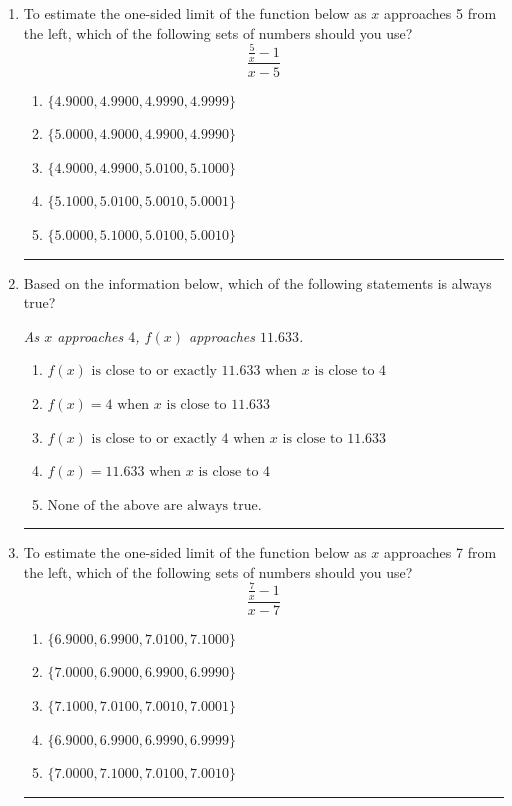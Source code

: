 \documentclass[14pt]{extbook}
\newcommand{\litem}[1]{\item#1\hspace*{-1cm}\rule{\textwidth}{0.4pt}}
\begin{document}
\begin{enumerate}
\litem{
To estimate the one-sided limit of the function below as $x$ approaches 5 from the left, which of the following sets of numbers should you use?\[ \frac{\frac{5}{x} - 1}{x - 5} \]\begin{enumerate}[label=\Alph*.]
\item \( \{ 4.9000, 4.9900, 4.9990, 4.9999 \} \)
\item \( \{ 5.0000, 4.9000, 4.9900, 4.9990 \} \)
\item \( \{ 4.9000, 4.9900, 5.0100, 5.1000 \} \)
\item \( \{ 5.1000, 5.0100, 5.0010, 5.0001 \} \)
\item \( \{ 5.0000, 5.1000, 5.0100, 5.0010 \} \)

\end{enumerate} }
\litem{
Based on the information below, which of the following statements is always true?
\begin{center}
    \textit{ As $x$ approaches $4$, $f(x)$ approaches $11.633$. }
\end{center}
\begin{enumerate}[label=\Alph*.]
\item \( f(x) \text{ is close to or exactly } 11.633 \text{ when } x \text{ is close to } 4 \)
\item \( f(x) = 4 \text{ when } x \text{ is close to } 11.633 \)
\item \( f(x) \text{ is close to or exactly } 4 \text{ when } x \text{ is close to } 11.633 \)
\item \( f(x) = 11.633 \text{ when } x \text{ is close to } 4 \)
\item \( \text{None of the above are always true.} \)

\end{enumerate} }
\litem{
To estimate the one-sided limit of the function below as $x$ approaches 7 from the left, which of the following sets of numbers should you use?\[ \frac{\frac{7}{x} - 1}{x - 7} \]\begin{enumerate}[label=\Alph*.]
\item \( \{ 6.9000, 6.9900, 7.0100, 7.1000 \} \)
\item \( \{ 7.0000, 6.9000, 6.9900, 6.9990 \} \)
\item \( \{ 7.1000, 7.0100, 7.0010, 7.0001 \} \)
\item \( \{ 6.9000, 6.9900, 6.9990, 6.9999 \} \)
\item \( \{ 7.0000, 7.1000, 7.0100, 7.0010 \} \)


\end{enumerate}}
\end{enumerate}
\end{document}
